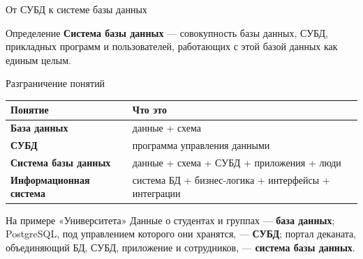 \documentclass[aspectratio=169]{beamer}
\begin{document}
\begin{frame}{От СУБД к системе базы данных}

\begin{center}
\end{center}

\vspace{0.1cm}
\small
\begin{block}{Определение}
\textbf{Система базы данных} — совокупность базы данных,
СУБД, прикладных программ и пользователей, работающих
с этой базой данных как единым целым.
\end{block}
\normalsize

\end{frame}


\begin{frame}{Разграничение понятий}

\small
\begin{table}
\centering
\begin{tabular}{>{\bfseries}p{}|p{}}
\toprule
Понятие & Что это\\
\midrule
База данных & данные + схема\\
СУБД & программа управления данными\\
Система базы данных & данные + схема + СУБД + приложения + люди\\
Информационная система & система БД + бизнес-логика + интерфейсы + интеграции\\
\bottomrule
\end{tabular}
\end{table}

\vspace{0.4cm}

\begin{alertblock}{На примере «Университета»}
Данные о студентах и группах — \textbf{база данных};
PostgreSQL, под управлением которого они хранятся, —
\textbf{СУБД}; портал деканата, объединяющий БД, СУБД,
приложение и сотрудников, — \textbf{система базы данных}.
\end{alertblock}

\end{frame}
\end{document}
